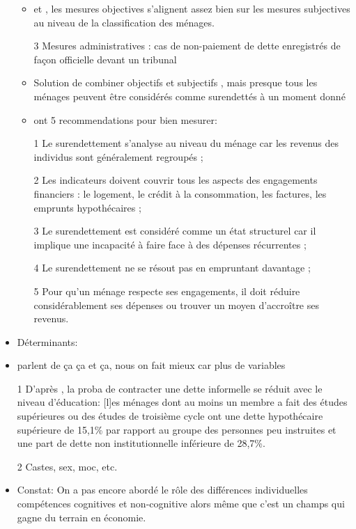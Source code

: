 \documentclass[a4paper, 11pt, onecolumn]{article}
\begin{document}
\begin{itemize}
\begin{itemize}
	\item \citep{Keese2012} et \citep{Rinaldi2006}, les mesures objectives s’alignent assez bien sur les mesures subjectives au niveau de la classification des ménages.
	\item[3] Mesures administratives : cas de non-paiement de dette enregistrés de façon officielle devant un tribunal
	\item Solution de combiner objectifs et subjectifs \citep{Aniola2012} \citep{Gumy2007}, mais presque tous les ménages peuvent être considérés comme surendettés à un moment donné \citep{Chichaibelu2018}
	\item \citep{European2010} ont 5 recommendations pour bien mesurer:
	\item[1] Le surendettement s’analyse au niveau du ménage car les revenus des individus sont généralement regroupés ;
	\item[2] Les indicateurs doivent couvrir tous les aspects des engagements financiers : le logement, le crédit à la consommation, les factures, les emprunts hypothécaires ;
	\item[3] Le surendettement est considéré comme un état structurel car il implique une incapacité à faire face à des dépenses récurrentes ;
	\item[4] Le surendettement ne se résout pas en empruntant davantage ;
	\item[5] Pour qu’un ménage respecte ses engagements, il doit réduire considérablement ses dépenses ou trouver un moyen d’accroître ses revenus.
	\end{itemize}

\item Déterminants:

\item \citep{Datta2018, Pandey2016} parlent de ça ça et ça, nous on fait mieux car plus de variables

\item[1] D'après \citep{Badarinza2016b}, la proba de contracter une dette informelle se réduit avec le niveau d'éducation: [l]es ménages dont au moins un membre a fait des études supérieures ou des études de troisième cycle ont une dette hypothécaire supérieure de 15,1\% par rapport au groupe des personnes peu instruites et une part de dette non institutionnelle inférieure de 28,7\%.
\item[2] Castes, sex, moc, etc. \citep{Guerin2012a} \citep{Guerin2013a} \citep{Guerin2014} \citep{Reboul2020} 
\item Constat: On a pas encore abordé le rôle des différences individuelles compétences cognitives et non-cognitive alors même que c'est un champs qui gagne du terrain en économie.
\end{itemize}
\end{document}
